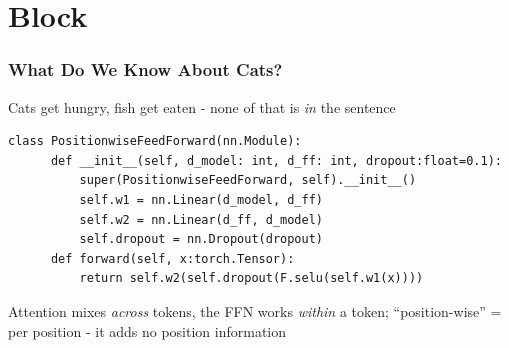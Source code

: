 \documentclass{beamer}
\begin{document}

\section*{Block}

\begin{frame}[fragile]
  \frametitle{What Do We Know About Cats?}
  \smallskip
  {\small Cats get hungry, fish get eaten - none of that is \emph{in} the sentence\par}
  \vfill
  \begin{lstlisting}[basicstyle=\ttfamily\tiny]
  class PositionwiseFeedForward(nn.Module):
      def __init__(self, d_model: int, d_ff: int, dropout:float=0.1):
          super(PositionwiseFeedForward, self).__init__()
          self.w1 = nn.Linear(d_model, d_ff)
          self.w2 = nn.Linear(d_ff, d_model)
          self.dropout = nn.Dropout(dropout)
      def forward(self, x:torch.Tensor):
          return self.w2(self.dropout(F.selu(self.w1(x))))
  \end{lstlisting}
  \vfill
  {\small Attention mixes \emph{across} tokens, the FFN works \emph{within} a token; ``position-wise'' = per position - it adds no position information}
\end{frame}
\end{document}
